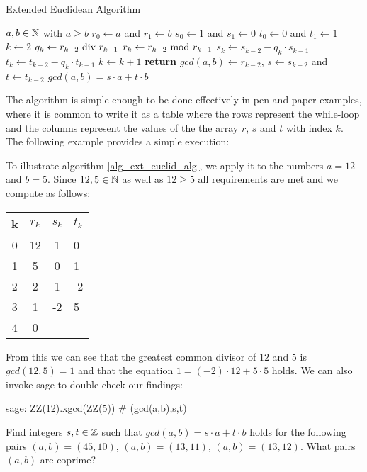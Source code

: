 \begin{algorithm}\caption{Extended Euclidean Algorithm}
\label{alg_ext_euclid_alg}
\begin{algorithmic}[0]
\Require $a,b \in \mathbb{N}$ with $a\geq b$
\State $r_0\gets a$ and $r_1\gets b$
\State $s_0\gets 1$ and $s_1\gets 0$
\State $t_0\gets 0$ and $t_1\gets 1$
\State $k\gets 2$
\State $ q_k\gets r_{k-2} \text{ div } r_{k-1} $
\State $ r_{k}\gets r_{k-2} \text{ mod } r_{k-1} $
\State $ s_{k}\gets s_{k-2} -q_k \cdot s_{k-1} $
\State $ t_{k}\gets t_{k-2} -q_k \cdot t_{k-1} $
\State $ k \gets k + 1 $
\EndWhile
\State \textbf{return} $gcd(a,b)\gets r_{k-2}$, $s\gets s_{k-2}$ and $ t \gets t_{k-2} $
\EndProcedure
\Ensure $ gcd (a, b) = s \cdot a + t \cdot b $
\end{algorithmic}
\end{algorithm}
The algorithm is simple enough to be done effectively in pen-and-paper examples, where it is common to write it as a table where the rows represent the while-loop and the columns represent the values of the the array $r$, $s$ and $t$ with index $k$. The following example provides a simple execution:
\begin{example}
\label{example:extended_euklidean_division_1}
To illustrate algorithm \ref{alg_ext_euclid_alg}, we apply it to the numbers $a=12$ and $b=5$. Since $12,5\in \mathbb{N}$ as well as $12\geq 5$ all requirements are met and we compute as follows:
\begin{center}
  \begin{tabular}{c | c c l}
    k & $ r_k $ & $ s_k $ & $ t_k $ \\\hline
    0 & 12 & 1 & 0 \\
    1 & 5 & 0 & 1 \\
    2 & 2 & 1 & -2 \\
    3 & 1 & -2 & 5 \\
    4 & 0 &  &  \\
  \end{tabular}
\end{center}
From this we can see that the greatest common divisor of $12$ and $5$ is $ gcd (12, 5) = 1 $ and that the equation $ 1 = (-2) \cdot 12 + 5 \cdot 5 $ holds. We can also invoke sage to double check our findings:
\begin{sagecommandline}
sage: ZZ(12).xgcd(ZZ(5)) # (gcd(a,b),s,t)
\end{sagecommandline}
\end{example}
\begin{exercise}
\label{exercise:extended_euklidean_division_1}
Find integers $s,t\in\mathbb{Z}$ such that $gcd(a,b)= s\cdot a +t\cdot b$ holds for the following pairs $(a,b) = (45,10)$, $(a,b)=(13,11)$, $(a,b)=(13,12)$. What pairs $(a,b)$ are coprime?
\end{exercise}
